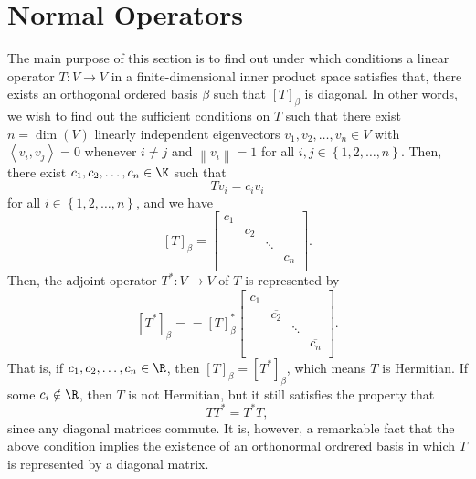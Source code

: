 \documentclass[linearalgebraII]{subfiles}
\begin{document}
    \section{Normal Operators}
    
    \begin{remark}
        The main purpose of this section is to find out under which conditions a linear operator $T:V\to V$ in a finite-dimensional inner product space satisfies that, there exists an orthogonal ordered basis $\beta$ such that $\left[ T \right] _\beta$ is diagonal. In other words, we wish to find out the sufficient conditions on $T$ such that there exist $n=\dim(V)$ linearly independent eigenvectors $v_1,v_2,\ldots,v_n\in V$ with $\left\langle v_i, v_j\right\rangle = 0$ whenever $i\neq j$ and $\left\lVert v_i\right\rVert = 1$ for all $i,j\in\left\lbrace 1,2,\ldots,n \right\rbrace$. Then, there exist $c_1,c_2,\ldots,c_n\in\K$ such that
        \begin{equation*}
            Tv_i = c_iv_i
        \end{equation*}
        for all $i\in\left\lbrace 1,2,\ldots,n \right\rbrace$, and we have
        \begin{equation*}
            \left[ T \right] _\beta = 
            \begin{bmatrix}
                c_1 & & & \\
                & c_2 & & \\
                & & \ddots & \\
                & & & c_n \\
            \end{bmatrix}.
        \end{equation*}
        Then, the adjoint operator $T^*:V\to V$ of $T$ is represented by
        \begin{equation*}
            \left[ T^* \right] _\beta = = \left[ T \right] _\beta^*
            \begin{bmatrix}
                \overline{c_1} & & & \\
                & \overline{c_2} & & \\
                & & \ddots& \\
                & & & \overline{c_n} \\
            \end{bmatrix}.
        \end{equation*}
        That is, if $c_1,c_2,\ldots,c_n\in\R$, then $\left[ T \right] _\beta = \left[ T^* \right] _\beta$, which means $T$ is Hermitian. If some $c_i\notin\R$, then $T$ is not Hermitian, but it still satisfies the property that
        \begin{equation*}
            TT^* = T^*T,
        \end{equation*}
        since any diagonal matrices commute. It is, however, a remarkable fact that the above condition implies the existence of an orthonormal ordrered basis in which $T$ is represented by a diagonal matrix.
    \end{remark}
\end{document}
